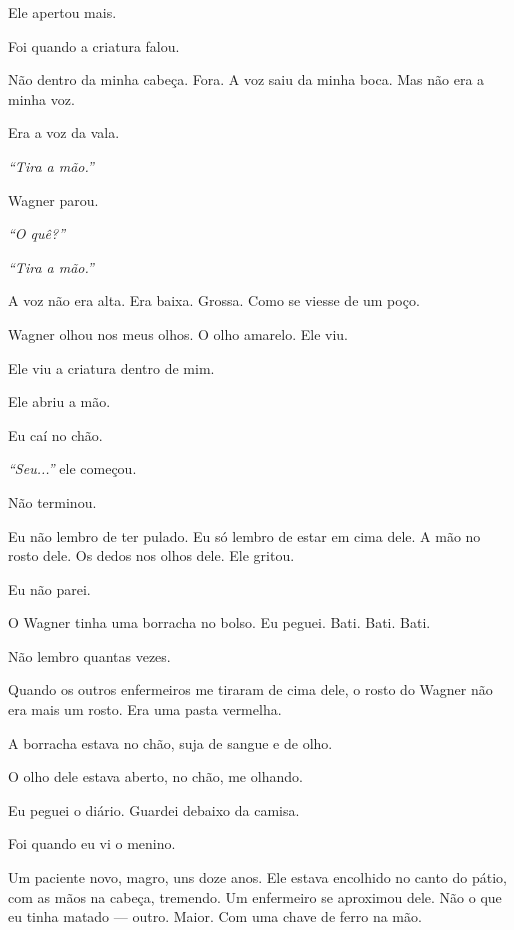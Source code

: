 \noindent Ele apertou mais.

\noindent Foi quando a criatura falou.

\noindent Não dentro da minha cabeça. Fora. A voz saiu da minha boca. Mas não era a minha voz.

\noindent Era a voz da vala.

\noindent \textit{\textquotedblleft{}Tira a mão.\textquotedblright{}}

\noindent Wagner parou.

\noindent \textit{\textquotedblleft{}O quê?\textquotedblright{}}

\noindent \textit{\textquotedblleft{}Tira a mão.\textquotedblright{}}

\noindent A voz não era alta. Era baixa. Grossa. Como se viesse de um poço.

\noindent Wagner olhou nos meus olhos. O olho amarelo. Ele viu.

\noindent Ele viu a criatura dentro de mim.

\noindent Ele abriu a mão.

\noindent Eu caí no chão.

\noindent \textit{\textquotedblleft{}Seu...\textquotedblright{}} ele começou.

\noindent Não terminou.

\noindent Eu não lembro de ter pulado. Eu só lembro de estar em cima dele. A mão no rosto dele. Os dedos nos olhos dele. Ele gritou.

\noindent Eu não parei.

\noindent O Wagner tinha uma borracha no bolso. Eu peguei. Bati. Bati. Bati.

\noindent Não lembro quantas vezes.

\noindent Quando os outros enfermeiros me tiraram de cima dele, o rosto do Wagner não era mais um rosto. Era uma pasta vermelha.

\noindent A borracha estava no chão, suja de sangue e de olho.

\noindent O olho dele estava aberto, no chão, me olhando.

\noindent Eu peguei o diário. Guardei debaixo da camisa.

\noindent Foi quando eu vi o menino.

\noindent Um paciente novo, magro, uns doze anos. Ele estava encolhido no canto do pátio, com as mãos na cabeça, tremendo. Um enfermeiro se aproximou dele. Não o que eu tinha matado --- outro. Maior. Com uma chave de ferro na mão.

